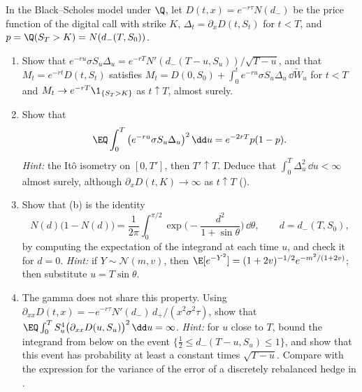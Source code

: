 \begin{exercise}\label{ex:fk-digital-hedge}
\hard In the Black--Scholes model under $\Q$, let $D(t,x)=e^{-r\tau}N(d_-)$ be the price function of
the digital call with strike $K$, $\Delta_t=\partial_xD(t,S_t)$ for $t<T$, and $p=\Q(S_T>K)=N(d_-(T,S_0))$.
\begin{enumerate}[label=(\alph*)]
  \item Show that $e^{-ru}\sigma S_u\Delta_u=e^{-rT}N'(d_-(T-u,S_u))/\sqrt{T-u}$, and that
    $M_t=e^{-rt}D(t,S_t)$ satisfies $M_t=D(0,S_0)+\int_0^te^{-ru}\sigma S_u\Delta_u\,\dd\widetilde W_u$ for
    $t<T$ and $M_t\to e^{-rT}\1_{\{S_T>K\}}$ as $t\uparrow T$, almost surely.
  \item Show that
    \[
      \EQ\int_0^T\big(e^{-ru}\sigma S_u\Delta_u\big)^2\,\dd u=e^{-2rT}p(1-p).
    \]
    \emph{Hint:} the It\^o isometry on $[0,T']$, then $T'\uparrow T$. Deduce that
    $\int_0^T\Delta_u^2\,\dd u<\infty$ almost surely, although $\partial_xD(t,K)\to\infty$ as $t\uparrow T$
    ().
  \item Show that (b) is the identity
    \[
      N(d)\big(1-N(d)\big)=\frac1{2\pi}\int_0^{\pi/2}\exp\Big(-\frac{d^2}{1+\sin\theta}\Big)\,\dd\theta,
      \qquad d=d_-(T,S_0),
    \]
    by computing the expectation of the integrand at each time $u$, and check it for $d=0$.
    \emph{Hint:} if $Y\sim\mathcal N(m,v)$, then $\E[e^{-Y^2}]=(1+2v)^{-1/2}e^{-m^2/(1+2v)}$; then
    substitute $u=T\sin\theta$.
  \item The gamma does not share this property. Using
    $\partial_{xx}D(t,x)=-e^{-r\tau}N'(d_-)\,d_+/(x^2\sigma^2\tau)$, show that
    $\EQ\int_0^TS_u^4\big(\partial_{xx}D(u,S_u)\big)^2\,\dd u=\infty$. \emph{Hint:} for $u$ close to $T$,
    bound the integrand from below on the event $\{\frac12\le d_-(T-u,S_u)\le1\}$, and show that this
    event has probability at least a constant times $\sqrt{T-u}$. Compare with the expression for the
    variance of the error of a discretely rebalanced hedge in .
\end{enumerate}
\end{exercise}

